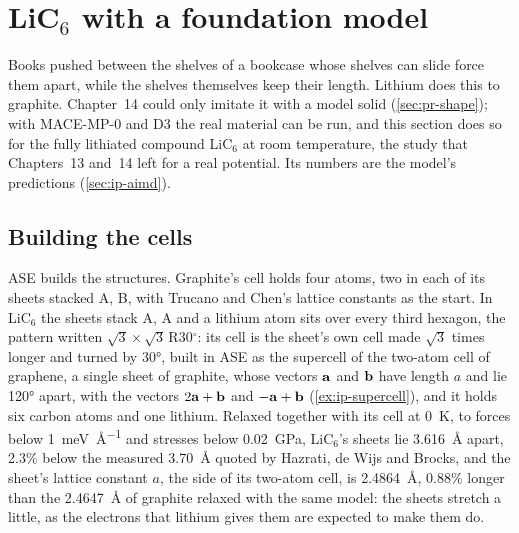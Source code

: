 \section{\texorpdfstring{LiC$_6$}{LiC6} with a foundation model}
\label{sec:ip-lic6}

Books pushed between the shelves of a bookcase whose shelves can slide
force them apart, while the shelves themselves keep their length. Lithium
does this to graphite. Chapter~14 could only imitate it with a model solid
(\cref{sec:pr-shape}); with MACE-MP-0 and D3 the real material can be
run, and this section does so for the fully lithiated compound LiC$_6$ at
room temperature, the study that Chapters~13 and~14 left for a real
potential. Its numbers are the model's predictions (\cref{sec:ip-aimd}).

\subsection*{Building the cells}

ASE builds the structures. Graphite's cell holds four atoms, two in each
of its sheets stacked A, B, with Trucano and Chen's lattice constants as
the start. In LiC$_6$ the sheets stack A, A and a lithium atom sits over
every third hexagon, the pattern written
$\sqrt3\times\sqrt3$\,R30$^\circ$: its cell is the sheet's own cell made
$\sqrt3$ times longer and turned by \ang{30}, built in ASE as the
supercell of the two-atom cell of graphene, a single sheet of graphite,
whose vectors $\bm{\mathrm{a}}$ and $\bm{\mathrm{b}}$ have length $a$ and lie \ang{120}
apart, with the vectors $2\bm{\mathrm{a}} + \bm{\mathrm{b}}$ and $-\bm{\mathrm{a}} + \bm{\mathrm{b}}$
(\cref{ex:ip-supercell}), and it holds six carbon atoms and one lithium.
Relaxed together with its cell at \SI{0}{\kelvin}, to forces below
\SI{1}{\milli\electronvolt\per\angstrom} and stresses below
\SI{0.02}{\giga\pascal}, LiC$_6$'s sheets lie \SI{3.616}{\angstrom} apart,
2.3\% below the measured \SI{3.70}{\angstrom} quoted by Hazrati, de Wijs
and Brocks\cite{Hazrati2014}, and the sheet's lattice constant $a$, the
side of its two-atom cell, is \SI{2.4864}{\angstrom}, 0.88\% longer than
the \SI{2.4647}{\angstrom} of graphite relaxed with the same model: the
sheets stretch a little, as the electrons that lithium gives them are
expected to make them do.

